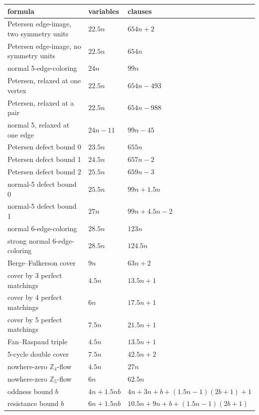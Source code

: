 \begin{tabular}{lll}
\toprule
formula & variables & clauses\\
\midrule
Petersen edge-image, two symmetry units & $22.5n$ & $654n+2$\\
Petersen edge-image, no symmetry units & $22.5n$ & $654n$\\
normal 5-edge-coloring & $24n$ & $99n$\\
Petersen, relaxed at one vertex & $22.5n$ & $654n-493$\\
Petersen, relaxed at a pair & $22.5n$ & $654n-988$\\
normal 5, relaxed at one edge & $24n-11$ & $99n-45$\\
Petersen defect bound 0 & $23.5n$ & $655n$\\
Petersen defect bound 1 & $24.5n$ & $657n-2$\\
Petersen defect bound 2 & $25.5n$ & $659n-3$\\
normal-5 defect bound 0 & $25.5n$ & $99n+1.5n$\\
normal-5 defect bound 1 & $27n$ & $99n+4.5n-2$\\
normal 6-edge-coloring & $28.5n$ & $123n$\\
strong normal 6-edge-coloring & $28.5n$ & $124.5n$\\
Berge--Fulkerson cover & $9n$ & $63n+2$\\
cover by 3 perfect matchings & $4.5n$ & $13.5n+1$\\
cover by 4 perfect matchings & $6n$ & $17.5n+1$\\
cover by 5 perfect matchings & $7.5n$ & $21.5n+1$\\
Fan--Raspaud triple & $4.5n$ & $13.5n+1$\\
5-cycle double cover & $7.5n$ & $42.5n+2$\\
nowhere-zero $\mathbb Z_4$-flow & $4.5n$ & $27n$\\
nowhere-zero $\mathbb Z_5$-flow & $6n$ & $62.5n$\\
oddness bound $b$ & $4n+1.5nb$ & $4n+3n+b+(1.5n-1)(2b+1)+1$\\
resistance bound $b$ & $6n+1.5nb$ & $10.5n+9n+b+(1.5n-1)(2b+1)$\\
\bottomrule
\end{tabular}
